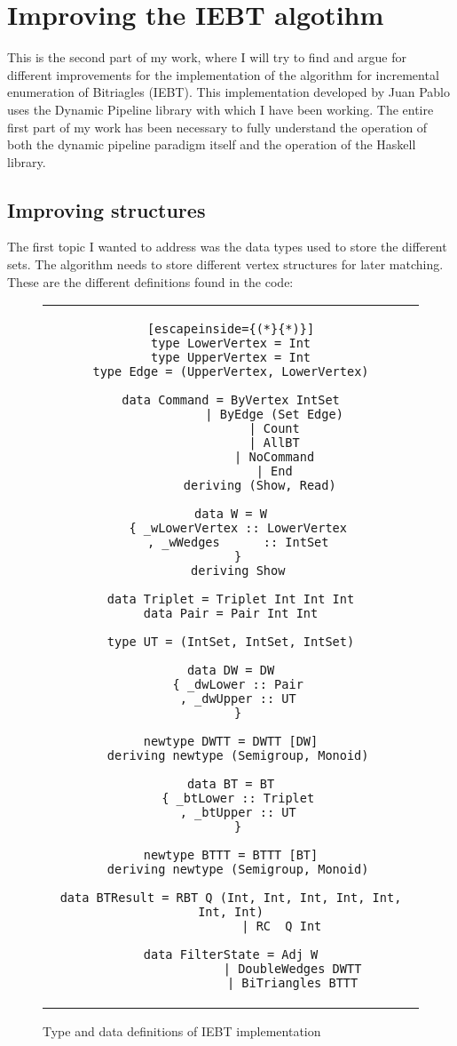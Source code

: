 \chapter{Improving the IEBT algotihm} \label{IEBT}
This is the second part of my work, where I will try to find and argue for different improvements for the implementation of the algorithm for incremental enumeration of Bitriagles (IEBT).
This implementation developed by Juan Pablo uses the Dynamic Pipeline library with which I have been working.
The entire first part of my work has been necessary to fully understand the operation of both the dynamic pipeline paradigm itself and the operation of the Haskell library.

\section{Improving structures}
The first topic I wanted to address was the data types used to store the different sets.
The algorithm needs to store different vertex structures for later matching.
These are the different definitions found in the code:

\begin{figure}[H]
    \begin{tabular}{c}
        \begin{lstlisting}[escapeinside={(*}{*)}]
type LowerVertex = Int
type UpperVertex = Int
type Edge = (UpperVertex, LowerVertex)

data Command = ByVertex IntSet
            | ByEdge (Set Edge)
            | Count
            | AllBT
            | NoCommand
            | End
        deriving (Show, Read)

data W = W
  { _wLowerVertex :: LowerVertex
  , _wWedges      :: IntSet
  }
  deriving Show

data Triplet = Triplet Int Int Int
data Pair = Pair Int Int

type UT = (IntSet, IntSet, IntSet)

data DW = DW
  { _dwLower :: Pair
  , _dwUpper :: UT
  }

newtype DWTT = DWTT [DW]
  deriving newtype (Semigroup, Monoid)

data BT = BT
  { _btLower :: Triplet
  , _btUpper :: UT
  }

newtype BTTT = BTTT [BT]
  deriving newtype (Semigroup, Monoid)

data BTResult = RBT Q (Int, Int, Int, Int, Int, Int, Int)
              | RC  Q Int

data FilterState = Adj W
                 | DoubleWedges DWTT
                 | BiTriangles BTTT
        \end{lstlisting}
    \end{tabular}
    \caption[{[IEBT] Type and data definitions}]{Type and data definitions of IEBT implementation}
    \label{fig:HC40}
\end{figure}



